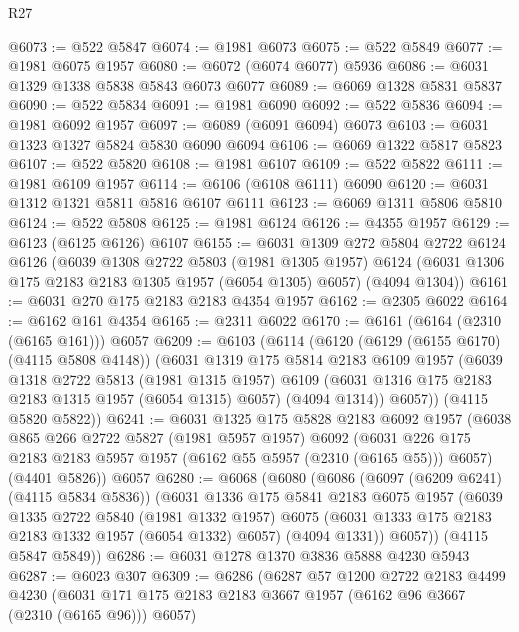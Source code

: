 \begin{lexlean}{R27}
\begin{coremodule}
@6073 := @522 @5847
@6074 := @1981 @6073
@6075 := @522 @5849
@6077 := @1981 @6075 @1957
@6080 := @6072 (@6074 @6077) @5936
@6086 := @6031 @1329 @1338 @5838 @5843 @6073 @6077
@6089 := @6069 @1328 @5831 @5837
@6090 := @522 @5834
@6091 := @1981 @6090
@6092 := @522 @5836
@6094 := @1981 @6092 @1957
@6097 := @6089 (@6091 @6094) @6073
@6103 := @6031 @1323 @1327 @5824 @5830 @6090 @6094
@6106 := @6069 @1322 @5817 @5823
@6107 := @522 @5820
@6108 := @1981 @6107
@6109 := @522 @5822
@6111 := @1981 @6109 @1957
@6114 := @6106 (@6108 @6111) @6090
@6120 := @6031 @1312 @1321 @5811 @5816 @6107 @6111
@6123 := @6069 @1311 @5806 @5810
@6124 := @522 @5808
@6125 := @1981 @6124
@6126 := @4355 @1957
@6129 := @6123 (@6125 @6126) @6107
@6155 := @6031
    @1309
    @272
    @5804
    @2722
    @6124
    @6126
    (@6039
      @1308
      @2722
      @5803
      (@1981 @1305 @1957)
      @6124
      (@6031 @1306 @175 @2183 @2183 @1305 @1957 (@6054 @1305) @6057)
      (@4094 @1304))
@6161 := @6031 @270 @175 @2183 @2183 @4354 @1957
@6162 := @2305 @6022
@6164 := @6162 @161 @4354
@6165 := @2311 @6022
@6170 := @6161 (@6164 (@2310 (@6165 @161))) @6057
@6209 := @6103
    (@6114
      (@6120
        (@6129 (@6155 @6170) (@4115 @5808 @4148))
        (@6031
          @1319
          @175
          @5814
          @2183
          @6109
          @1957
          (@6039
            @1318
            @2722
            @5813
            (@1981 @1315 @1957)
            @6109
            (@6031 @1316 @175 @2183 @2183 @1315 @1957 (@6054 @1315) @6057)
            (@4094 @1314))
          @6057))
      (@4115 @5820 @5822))
@6241 := @6031
    @1325
    @175
    @5828
    @2183
    @6092
    @1957
    (@6038
      @865
      @266
      @2722
      @5827
      (@1981 @5957 @1957)
      @6092
      (@6031 @226 @175 @2183 @2183 @5957 @1957 (@6162 @55 @5957 (@2310 (@6165 @55))) @6057)
      (@4401 @5826))
    @6057
@6280 := @6068
    (@6080
      (@6086
        (@6097 (@6209 @6241) (@4115 @5834 @5836))
        (@6031
          @1336
          @175
          @5841
          @2183
          @6075
          @1957
          (@6039
            @1335
            @2722
            @5840
            (@1981 @1332 @1957)
            @6075
            (@6031 @1333 @175 @2183 @2183 @1332 @1957 (@6054 @1332) @6057)
            (@4094 @1331))
          @6057))
      (@4115 @5847 @5849))
@6286 := @6031 @1278 @1370 @3836 @5888 @4230 @5943
@6287 := @6023 @307
@6309 := @6286
    (@6287
      @57
      @1200
      @2722
      @2183
      @4499
      @4230
      (@6031 @171 @175 @2183 @2183 @3667 @1957 (@6162 @96 @3667 (@2310 (@6165 @96))) @6057)

\end{coremodule}
\end{lexlean}
